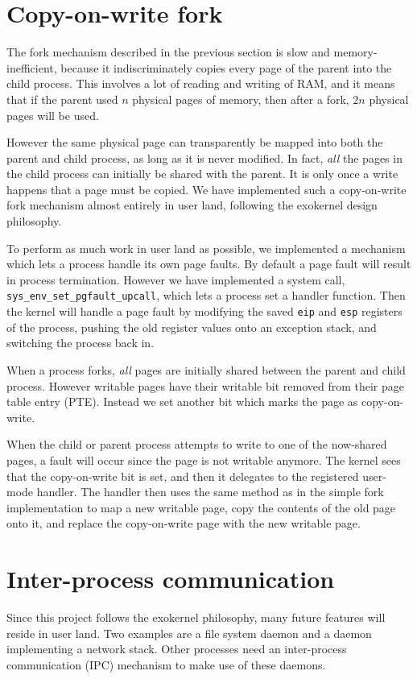 \documentclass{report}
\begin{document}
\section{Copy-on-write fork}
The fork mechanism described in the previous section is slow and
memory-inefficient, because it indiscriminately copies every page of the
parent into the child process. This involves a lot of reading and writing of
RAM, and it means that if the parent used $n$ physical pages of memory, then
after a fork, $2n$ physical pages will be used.

However the same physical page can transparently be mapped into both the
parent and child process, as long as it is never modified. In fact, \emph{all}
the pages in the child process can initially be shared with the parent. It is
only once a write happens that a page must be copied. We have implemented such
a copy-on-write fork mechanism almost entirely in user land, following the
exokernel design philosophy.

To perform as much work in user land as possible, we implemented a mechanism
which lets a process handle its own page faults. By default a page fault will
result in process termination. However we have implemented a system call,
\texttt{sys\_env\_set\_pgfault\_upcall}, which lets a process set a handler
function. Then the kernel will handle a page fault by modifying the saved
\texttt{eip} and \texttt{esp} registers of the process, pushing the old register
values onto an exception stack, and switching the process back in.

When a process forks, \emph{all} pages are initially shared between the parent
and child process. However writable pages have their writable bit removed from
their page table entry (PTE). Instead we set another bit which marks the
page as copy-on-write.

When the child or parent process attempts to write to one of the now-shared
pages, a fault will occur since the page is not writable anymore. The kernel
sees that the copy-on-write bit is set, and then it delegates to the
registered user-mode handler. The handler then uses the same method as in the
simple fork implementation to map a new writable page, copy the contents of
the old page onto it, and replace the copy-on-write page with the new writable
page.


\section{Inter-process communication}
Since this project follows the exokernel philosophy, many future features will
reside in user land. Two examples are a file system daemon and a daemon
implementing a network stack. Other processes need an inter-process
communication (IPC) mechanism to make use of these daemons.
\end{document}
